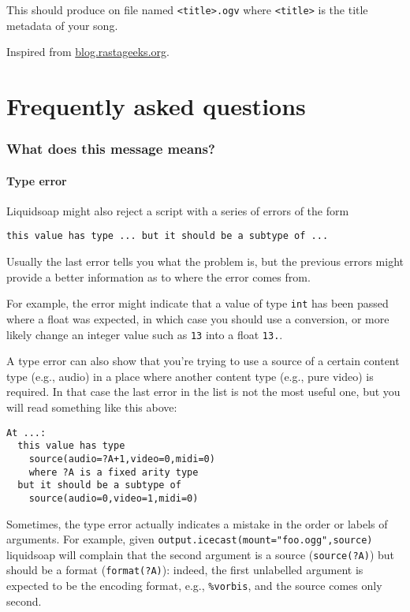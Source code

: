 \documentclass{book}
\begin{document}

This should produce on file named \verb+<title>.ogv+ where \verb+<title>+ is the
title metadata of your song.

Inspired from
\href{http://blog.rastageeks.org/spip.php?article27}{blog.rastageeks.org}.




\chapter{Frequently asked questions}
\subsection{What does this message means?}
\subsubsection{Type error}
Liquidsoap might also reject a script with a series of errors of the form
\begin{verbatim}
this value has type ... but it should be a subtype of ...
\end{verbatim}
Usually the last error tells you what the problem is, but the previous errors
might provide a better information as to where the error comes from.

For example, the error might indicate that a value of type \verb+int+ has been
passed where a float was expected, in which case you should use a conversion, or
more likely change an integer value such as \verb+13+ into a float \verb+13.+.

A type error can also show that you're trying to use a source of a certain
content type (e.g., audio) in a place where another content type (e.g., pure
video) is required. In that case the last error in the list is not the most
useful one, but you will read something like this above:

\begin{verbatim}
At ...:
  this value has type
    source(audio=?A+1,video=0,midi=0)
    where ?A is a fixed arity type
  but it should be a subtype of
    source(audio=0,video=1,midi=0)
\end{verbatim}
Sometimes, the type error actually indicates a mistake in the order or labels of
arguments. For example, given \verb+output.icecast(mount="foo.ogg",source)+
liquidsoap will complain that the second argument is a source
(\verb+source(?A)+) but should be a format (\verb+format(?A)+): indeed, the
first unlabelled argument is expected to be the encoding format, e.g.,
\verb+%vorbis+, and the source comes only second.
\end{document}
